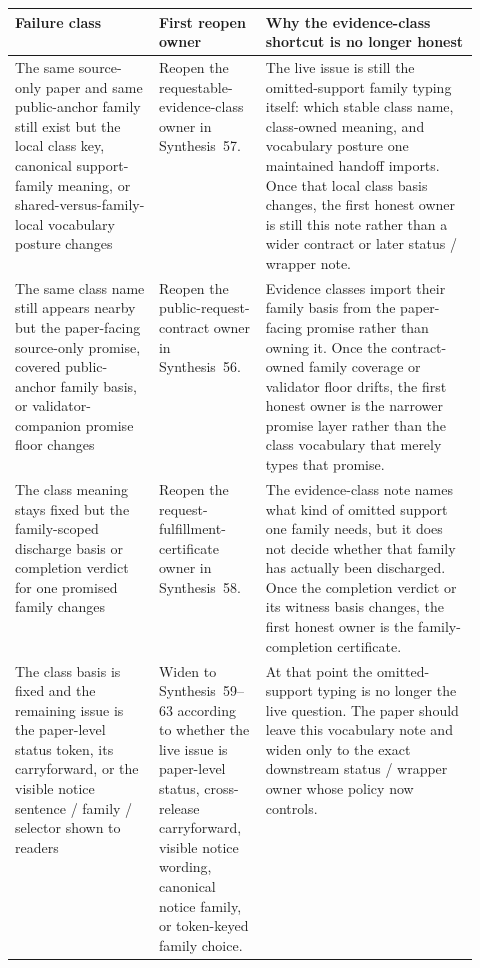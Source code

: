 \documentclass[11pt]{article}
\begin{document}
\begin{table}[t]
\centering
\small
\begin{tabularx}{\linewidth}{@{}p{0.31\linewidth}p{0.23\linewidth}X@{}}
\toprule
Failure class & First reopen owner & Why the evidence-class shortcut is no longer honest \\
\midrule
The same source-only paper and same public-anchor family still exist but the local class key, canonical support-family meaning, or shared-versus-family-local vocabulary posture changes & Reopen the requestable-evidence-class owner in Synthesis~57. & The live issue is still the omitted-support family typing itself: which stable class name, class-owned meaning, and vocabulary posture one maintained handoff imports. Once that local class basis changes, the first honest owner is still this note rather than a wider contract or later status / wrapper note. \\
The same class name still appears nearby but the paper-facing source-only promise, covered public-anchor family basis, or validator-companion promise floor changes & Reopen the public-request-contract owner in Synthesis~56. & Evidence classes import their family basis from the paper-facing promise rather than owning it. Once the contract-owned family coverage or validator floor drifts, the first honest owner is the narrower promise layer rather than the class vocabulary that merely types that promise. \\
The class meaning stays fixed but the family-scoped discharge basis or completion verdict for one promised family changes & Reopen the request-fulfillment-certificate owner in Synthesis~58. & The evidence-class note names what kind of omitted support one family needs, but it does not decide whether that family has actually been discharged. Once the completion verdict or its witness basis changes, the first honest owner is the family-completion certificate. \\
The class basis is fixed and the remaining issue is the paper-level status token, its carryforward, or the visible notice sentence / family / selector shown to readers & Widen to Synthesis~59--63 according to whether the live issue is paper-level status, cross-release carryforward, visible notice wording, canonical notice family, or token-keyed family choice. & At that point the omitted-support typing is no longer the live question. The paper should leave this vocabulary note and widen only to the exact downstream status / wrapper owner whose policy now controls. \\

\end{tabularx}
\end{table}
\end{document}
